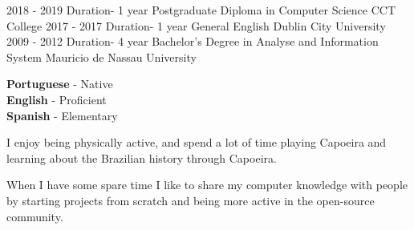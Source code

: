 \documentclass[9pt]{developercv} %
\begin{document}


\begin{entrylist}	
	\entry
		{2018 - 2019}
		{Duration- 1 year}
		{Postgraduate Diploma in Computer Science}
		{CCT College}
	\entry
		{2017 - 2017}
		{Duration- 1 year}
		{General English}
		{Dublin City University}
	\entry
		{2009 - 2012}
		{Duration- 4 year}
		{Bachelor's Degree in  Analyse and Information System}
		{Mauricio de Nassau University}
\end{entrylist}
\begin{minipage}[t]{0.3\textwidth}

	\vspace{-\baselineskip} %

	
	\textbf{Portuguese} - Native\\
	\textbf{English} - Proficient\\
	\textbf{Spanish} - Elementary
\end{minipage}
\hfill
\begin{minipage}[t]{0.3\textwidth}

	\vspace{-\baselineskip} %
	
	
	I enjoy being physically active, and spend a lot of time playing Capoeira and learning about the Brazilian history through Capoeira.
\end{minipage}
\hfill
\begin{minipage}[t]{0.3\textwidth}
	\vspace{-\baselineskip} %
	

When I have some spare time I like to share my computer knowledge with people by starting projects from scratch and being more active in the open-source community.
\end{minipage}
\end{document}
